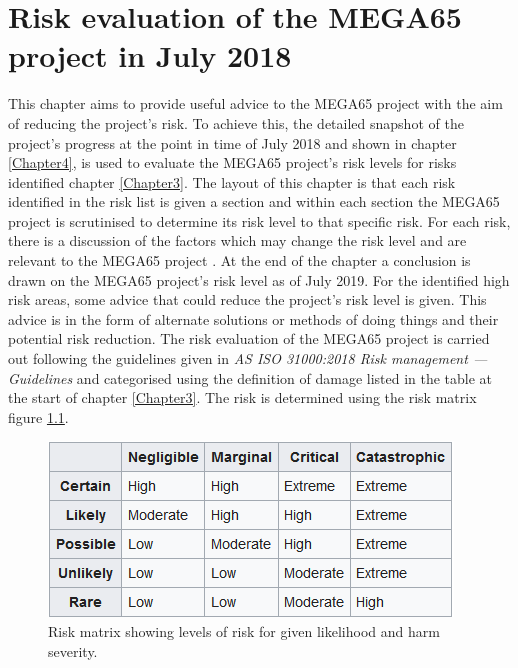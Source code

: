 
\chapter{Risk evaluation of the MEGA65 project in July 2018}
\label{Chapter5}
This chapter aims to provide useful advice to the MEGA65 project with the aim of reducing the project's risk. To achieve this, the detailed snapshot of the project's progress at the point in time of July 2018 and shown in chapter \ref{Chapter4}, is used to evaluate the MEGA65 project's risk levels for risks identified chapter \ref{Chapter3}. The layout of this chapter is that each risk identified in the risk list is given a section and within each section the MEGA65 project is scrutinised to determine its risk level to that specific risk. For each risk, there is a discussion of the factors which may change the risk level and are relevant to the MEGA65 project . At the end of the chapter a conclusion is drawn on the MEGA65 project's risk level as of July 2019. For the identified high risk areas, some advice that could reduce the project's risk level is given. This advice is in the form of alternate solutions or methods of doing things and their potential risk reduction. The risk evaluation of the MEGA65 project is carried out following the guidelines given in \textit{AS ISO 31000:2018 Risk management — Guidelines} 
\cite{RN164} and categorised using the definition of damage listed in the table at the start of chapter \ref{Chapter3}. The risk is determined using the risk matrix figure \ref{riskmatrix}.

\begin{figure} \begin{center}
\includegraphics[width=.3\linewidth]{pics/riskmatrix} 
\end{center} 
\caption{Risk matrix showing levels of risk for given likelihood and harm severity.\\}
\label{riskmatrix}
\end{figure}

